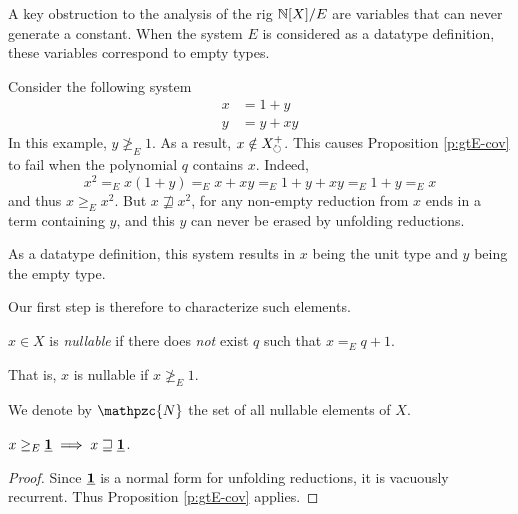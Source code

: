 \documentclass[numbers=enddot]{scrartcl}
\newcommand{\downe}[1]{{#1}{\downarrow_E}}
\newcommand{\nullX}{\mathpzc{N}}
\newcommand{\gtE}{\geq_E}
\newcommand{\cov}{\sqsupseteq}
\newcommand{\mone}{\ul{\mathbf{1}}}
\newcommand{\const}[1]{\ul{\mathbf{#1}}}
\begin{document}
A key obstruction to the analysis of the rig $\mathbb{N}[X]/E$ are variables that can never generate a constant.
When the system $E$ is considered as a datatype definition, these variables correspond to empty types.
\begin{expl}
Consider the following system
\begin{align*}
  x &= 1 + y \\
  y &= y + xy
\end{align*}
In this example, $y \not \gtE 1$. As a result, $x \notin X_{\circlearrowright}^+$.  This causes Proposition
\ref{p:gtE-cov} to fail when the polynomial $q$ contains $x$. Indeed,
\[ x^2 =_E x(1 + y) =_E x + xy =_E 1 + y + xy =_E 1 + y =_E x \]
and thus $x \gtE x^2$.
But $x \not \cov x^2$, for any non-empty reduction from $x$ ends in a term containing $y$, and this $y$ can never be erased by unfolding reductions.

As a datatype definition, this system results in $x$ being the unit type and $y$ being the empty type.
\end{expl}

Our first step is therefore to characterize such elements.

\begin{dfn}
  $x \in X$ is \emph{nullable} if there does \emph{not} exist $q$ such that
  $x =_E q + 1$.

  That is, $x$ is nullable if $x \not \gtE 1$.

  We denote by $\nullX$ the set of all nullable elements of $X$.
\end{dfn}

\begin{prop}
  $x \gtE \const 1 \implies x \cov \const 1$.
\end{prop}
\begin{proof}
  Since $\const 1$ is a normal form for unfolding reductions, it is vacuously recurrent.
  Thus Proposition \ref{p:gtE-cov} applies.
\end{proof}

\end{document}
